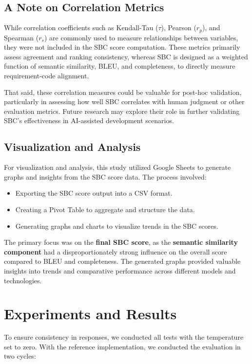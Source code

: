 \documentclass{article}
\begin{document}
\subsection{A Note on Correlation Metrics}

While correlation coefficients such as Kendall-Tau ($\tau$), Pearson ($r_p$), and Spearman ($r_s$) are commonly used to measure relationships between variables, they were not included in the SBC score computation. These metrics primarily assess agreement and ranking consistency, whereas SBC is designed as a weighted function of semantic similarity, BLEU, and completeness, to directly measure requirement-code alignment.

That said, these correlation measures could be valuable for post-hoc validation, particularly in assessing how well SBC correlates with human judgment or other evaluation metrics. Future research may explore their role in further validating SBC’s effectiveness in AI-assisted development scenarios.

\subsection{Visualization and Analysis}

For visualization and analysis, this study utilized Google Sheets to generate graphs and insights from the SBC score data. The process involved:

\begin{itemize}
    \item Exporting the SBC score output into a CSV format.
    \item Creating a Pivot Table to aggregate and structure the data.
    \item Generating graphs and charts to visualize trends in the SBC scores.
\end{itemize}

The primary focus was on the \textbf{final SBC score}, as the \textbf{semantic similarity component} had a disproportionately strong influence on the overall score compared to BLEU and completeness. The generated graphs provided valuable insights into trends and comparative performance across different models and technologies.


\section{Experiments and Results}

To ensure consistency in responses, we conducted all tests with the temperature set to zero. With the reference implementation, we conducted the evaluation in two cycles:  
\end{document}
